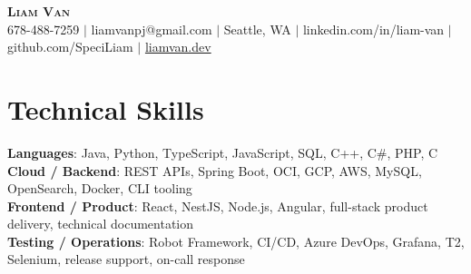 \documentclass[letterpaper,11pt]{article}
\begin{document}

%
\begin{center}
    \textbf{\Huge \scshape Liam Van} \\ \vspace{1pt}
    \small 678-488-7259 $|$ \small {liamvanpj@gmail.com} $|$ Seattle, WA
 {{$|$ linkedin.com/in/liam-van} {$|$ github.com/SpeciLiam} {$|$ \href{https://liamvan.dev}{liamvan.dev}}}

\end{center}

\section{Technical Skills}
 \begin{itemize}[leftmargin=0.15in, label={}]
    \small{\item{
     \textbf{Languages}{: Java, Python, TypeScript, JavaScript, SQL, C++, C\#, PHP, C} \\
     \textbf{Cloud / Backend}{: REST APIs, Spring Boot, OCI, GCP, AWS, MySQL, OpenSearch, Docker, CLI tooling} \\
     \textbf{Frontend / Product}{: React, NestJS, Node.js, Angular, full-stack product delivery, technical documentation} \\
     \textbf{Testing / Operations}{: Robot Framework, CI/CD, Azure DevOps, Grafana, T2, Selenium, release support, on-call response} \\
    }}
 \end{itemize}
%

\end{document}
